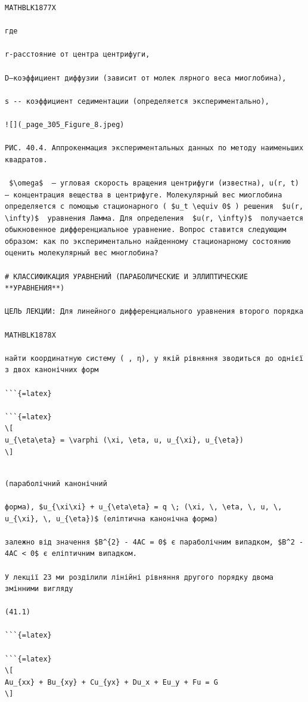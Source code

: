 \documentclass[
]{article}
\begin{document}
\begin{verbatim}
MATHBLK1877X

где

r-расстояние от центра центрифуги,

D—коэффициент диффузии (зависит от молек лярного веса миоглобина),

s -- коэффициент седиментации (определяется экспериментально),

![](_page_305_Figure_8.jpeg)

РИС. 40.4. Аппрокенмация экспериментальных данных по методу наименьших квадратов.

 $\omega$  — угловая скорость вращения центрифуги (известна), u(r, t) — концентрация вещества в центрифуге. Молекулярный вес миоглобина определяется с помощью стационарного ( $u_t \equiv 0$ ) решения  $u(r, \infty)$  уравнения Ламма. Для определения  $u(r, \infty)$  получается обыкновенное дифференциальное уравнение. Вопрос ставится следующим образом: как по экспериментально найденному стационарному состоянию оценить молекулярный вес многлобина?

# КЛАССИФИКАЦИЯ УРАВНЕНИЙ (ПАРАБОЛИЧЕСКИЕ И ЭЛЛИПТИЧЕСКИЕ **УРАВНЕНИЯ**)

ЦЕЛЬ ЛЕКЦИИ: Для линейного дифференциального уравнения второго порядка

MATHBLK1878X

найти координатную систему ( , η), у якій рівняння зводиться до однієї з двох канонічних форм

```{=latex}

```{=latex}
\[
u_{\eta\eta} = \varphi (\xi, \eta, u, u_{\xi}, u_{\eta})
\]
\end{verbatim}

\begin{verbatim}

(параболічний канонічний

форма), $u_{\xi\xi} + u_{\eta\eta} = q \; (\xi, \, \eta, \, u, \, u_{\xi}, \, u_{\eta})$ (еліптична канонічна форма)

залежно від значення $B^{2} - 4AC = 0$ є параболічним випадком, $B^2 - 4AC < 0$ є еліптичним випадком.

У лекції 23 ми розділили лінійні рівняння другого порядку двома змінними вигляду

(41.1)

```{=latex}

```{=latex}
\[
Au_{xx} + Bu_{xy} + Cu_{yx} + Du_x + Eu_y + Fu = G
\]
\end{verbatim}
\end{document}
